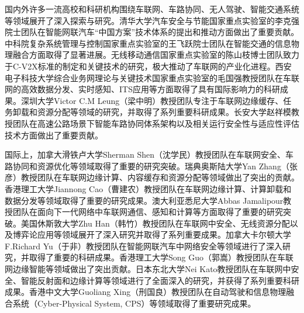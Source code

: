 国内外许多一流高校和科研机构围绕车联网、车路协同、无人驾驶、智能交通系统等领域展开了深入探索与研究。清华大学汽车安全与节能国家重点实验室的李克强院士团队在智能网联汽车“中国方案”技术体系的提出和推动方面做出了重要贡献\cite{wang2023design, li2017dynamical, zheng2016stability}。中科院复杂系统管理与控制国家重点实验室的王飞跃院士团队在智能交通的信息物理融合方面取得了显著进展\cite{li2023sharing, liu2021cyber, lv2021guest}。无线移动通信国家重点实验室的陈山枝博士团队致力于C-V2X标准的制定和关键技术的研究，极大推动了车联网的产业化进程\cite{chen2023cellular, chen2020a, chen2017vehicle}。西安电子科技大学综合业务网理论与关键技术国家重点实验室的毛国强教授团队在车联网的高效数据分发、实时感知、ITS应用等方面取得了具有国际影响力的科研成果\cite{zhang2022new, hao2022dhcloc, yue2022towards}。深圳大学Victor C.M Leung（梁中明）教授团队专注于车联网边缘缓存、任务卸载和资源分配等领域的研究，并取得了系列重要科研成果\cite{sun2023federated, ju2023joint, wang2022efficient}。长安大学赵祥模教授团队在高速公路场景下智能车路协同体系架构以及相关运行安全性与适应性评估技术方面做出了重要贡献\cite{fang2022a, fang2022on, jing2022integrated}。

国际上，加拿大滑铁卢大学Sherman Shen（沈学民）教授团队在车联网安全\cite{chen2022adaptive}、车路协同\cite{liu2022real}和资源优化\cite{li2022cost}等领域取得了重要的研究突破。瑞典奥斯陆大学Yan Zhang（张彦）教授团队在车联网边缘计算\cite{dai2022adaptive}、内容缓存\cite{zhang2022digital}和资源分配\cite{sun2022dynamic}等领域做出了突出的贡献。香港理工大学Jiannong Cao（曹建农）教授团队在车联网边缘计算\cite{yang2022delegating}、计算卸载\cite{dai2023a}和数据分发\cite{yang2020efficient}等领域取得了重要的研究成果。澳大利亚悉尼大学Abbas Jamalipour教授团队在面向下一代网络中车联网通信\cite{qi2022energy}、感知\cite{iranmanesh2022a}和计算\cite{alam2022multi}等方面取得了重要的研究突破。美国休斯敦大学Zhu Han（韩竹）教授团队在车联网中安全\cite{khan2023federated}、无线资源分配\cite{zhang2023mean}以及博弈论应用\cite{kang2021joint}等领域展开了深入研究并取得了系列重要成果。加拿大卡尔顿大学F.Richard Yu（于非）教授团队在智能网联汽车中网络安全\cite{alladi2023ambient, liang2023a, bai2022detection}等领域进行了深入研究，并取得了重要的科研成果。香港理工大学Song Guo（郭嵩）教授团队在车联网边缘智能\cite{wang2922imitation, ren2021blockchain, wang2022design}等领域做出了突出贡献。日本东北大学Nei Kato教授团队在车联网中安全\cite{tang2020future}、智能反射面\cite{zhu2022intelligent}和边缘计算\cite{liu2020smart}等领域进行了全面深入的研究，并获得了系列重要科研成果。香港中文大学Guoliang Xing（刑国良）教授团队在自动驾驶\cite{he2021vi}和信息物理融合系统（Cyber-Physical System, CPS）\cite{shi2022vips}等领域取得了重要研究成果。

